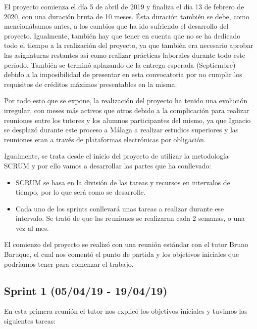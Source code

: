 El proyecto comienza el día 5 de abril de 2019 y finaliza el día 13 de febrero de 2020, con una duración bruta de 10 meses. Ésta duración también se debe, como mencionábamos antes, a los cambios que ha ido sufriendo el desarrollo del proyecto. Igualmente, también hay que tener en cuenta que no se ha dedicado todo el tiempo a la realización del proyecto, ya que también era necesario aprobar las asignaturas restantes así como realizar prácticas laborales durante todo este período. También se terminó aplazando de la entrega esperada (Septiembre) debido a la imposibilidad de presentar en esta convocatoria por no cumplir los requisitos de créditos máximos presentables en la misma.

Por todo esto que se expone, la realización del proyecto ha tenido una evolución irregular, con meses más activos que otros debido a la complicación para realizar reuniones entre los tutores y los alumnos participantes del mismo, ya que Ignacio se desplazó durante este proceso a Málaga a realizar estudios superiores y las reuniones eran a través de plataformas electrónicas por obligación.

Igualmente, se trata desde el inicio del proyecto de utilizar la metodología SCRUM y por ello vamos a desarrollar las partes que ha conllevado:

\begin{itemize}

\item SCRUM se basa en la división de las tareas y recursos en intervalos de tiempo, por lo que será como se desarrolle. 

\item Cada uno de los sprints conllevará unas tareas a realizar durante ese intervalo. Se trató de que las reuniones se realizaran cada 2 semanas, o una vez al mes.

\end{itemize}

El comienzo del proyecto se realizó con una reunión estándar con el tutor Bruno Baruque, el cual nos comentó el punto de partida y los objetivos iniciales que podríamos tener para comenzar el trabajo.

\subsection{Sprint 1 (05/04/19 - 19/04/19)}

En esta primera reunión el tutor nos explicó los objetivos iniciales y tuvimos las siguientes tareas:

